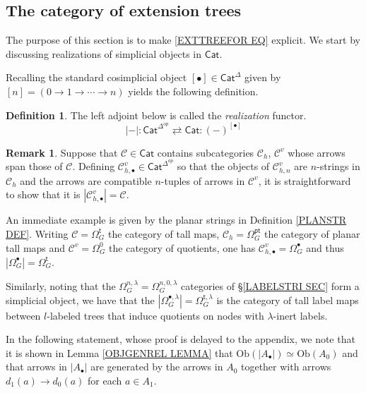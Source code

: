 \documentclass[a4paper,10pt
,draft
]{article}%
\numberwithin{equation}{section}
\numberwithin{figure}{section}
\theoremstyle{definition} %
\newtheorem{definition}[equation]{Definition}%
\newtheorem{remark}[equation]{Remark}%
\newcommand{\C}{\ensuremath{\mathcal C}}
\newcommand{\1}{\ensuremath{\mathbbm 1}}%
\begin{document}
\subsection{The category of extension trees}
\label{EXTTREE SEC}

The purpose of this section is to make \eqref{EXTTREEFOR EQ} explicit. We start by discussing 
realizations of simplicial objects in $\mathsf{Cat}$.

Recalling the standard cosimplicial object
$[\bullet] \in \mathsf{Cat}^{\Delta}$ given by 
$[n]=(0 \to 1 \to \cdots \to n)$
yields the following definition.

\begin{definition}\label{REAL DEF}
	The left adjoint below is called the 
	\textit{realization} functor.
	\[
	|\minus|\colon
	\mathsf{Cat}^{\Delta^{op}} 
		\rightleftarrows
	\mathsf{Cat} 
	\colon (\minus)^{[\bullet]}
	\]
\end{definition}

\begin{remark}\label{REALEX REM}
Suppose that $\C \in \mathsf{Cat}$ contains subcategories 
$\C_h$, $\C^v$ whose arrows span those of $\C$.
Defining 
$\mathcal{C}^{v}_{h,\bullet} \in \mathsf{Cat}^{\Delta^{op}}$
so that the objects of $\mathcal{C}^{v}_{h,n}$ are $n$-strings in $\C_h$ and the arrows are compatible $n$-tuples of
arrows in $\C^v$, it is straightforward to show
that it is
$|\mathcal{C}^{v}_{h,\bullet}| = \C$.

An immediate example is given by the planar strings in Definition \ref{PLANSTR DEF}. Writing 
$\C = \Omega_G^{\mathsf{t}}$ the category of tall maps,
$\C_h = \Omega_G^{\mathsf{pt}}$ the category of planar tall maps and
$\C^v = \Omega_G^{0}$ the category of quotients,
one has $\C_{h,\bullet}^{v} = \Omega_G^{\bullet}$ and thus
$|\Omega_G^{\bullet}| = \Omega_G^{\mathsf{t}}$.

Similarly, noting that the $\Omega_G^{n,\lambda} = \Omega_G^{n,0,\lambda}$
categories of \S \ref{LABELSTRI SEC} form a simplicial object, we have that the
$|\Omega_G^{\bullet,\lambda}| = \Omega_G^{\mathsf{t},\lambda}$
is the category of tall label maps between
$l$-labeled trees that induce quotients on 
nodes with $\lambda$-inert labels.
\end{remark}


In the following statement, whose proof is delayed to the appendix, we note that 
it is shown in Lemma \ref{OBJGENREL LEMMA}
that $\text{Ob}(|A_{\bullet}|) \simeq \text{Ob}(A_0)$
and that arrows in $|A_{\bullet}|$ are generated by
the arrows in $A_0$ together with arrows 
$d_1(a) \to d_0(a)$ for each $a \in A_1$.
\end{document}
